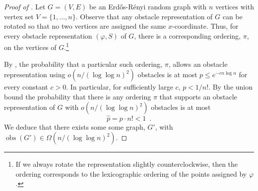 \documentclass{patmorin}
\DeclareMathOperator{\obs}{obs}
\begin{document}
\begin{proof}[Proof of ]
  Let $G=(V,E)$ be an Erd\H{o}s-R\'enyi random graph with $n$ vertices
  with vertex set $V=\{1,\ldots,n\}$.  Observe that any obstacle
  representation of $G$ can be rotated so that no two vertices
  are assigned the same $x$-coordinate. Thus, for every obstacle
  representation $(\varphi, S)$ of $G$, there is a corresponding ordering,
  $\pi$, on the vertices of $G$.\footnote{If we always rotate the representation slightly counterclockwise, then the ordering corresponds to the lexicographic ordering of the points assigned by $\varphi$.}

  By , the probability that a particular such ordering,
  $\pi$, allows an obstacle representation using $o(n/(\log\log n)^2)$
  obstacles is at most $p\le e^{-cn\log n}$ for every constant $c>0$. In
  particular, for sufficiently large $c$, $p < 1/n!$.  By the union
  bound the probability that there is any ordering $\pi$ that supports an
  obstacle representation of $G$ with $o(n/(\log\log n)^2)$ obstacles is
  at most
  \[
     \hat p = p\cdot n! < 1 \enspace .
  \]
  We deduce that there exists some some graph,
  $G'$, with $\obs(G')\in \Omega(n/(\log\log n)^2)$.
\end{proof}
\end{document}
